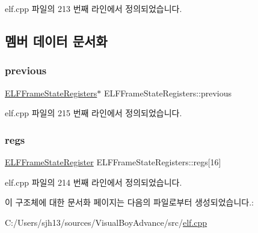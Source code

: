 elf.\+cpp 파일의 213 번째 라인에서 정의되었습니다.



\subsection{멤버 데이터 문서화}
\mbox{\label{struct_e_l_f_frame_state_registers_ac15ca53b64834c92c4c43b2652a082ed}} 
\subsubsection{\texorpdfstring{previous}{previous}}
{\footnotesize\ttfamily \mbox{\hyperlink{struct_e_l_f_frame_state_registers}{E\+L\+F\+Frame\+State\+Registers}}$\ast$ E\+L\+F\+Frame\+State\+Registers\+::previous}



elf.\+cpp 파일의 215 번째 라인에서 정의되었습니다.

\mbox{\label{struct_e_l_f_frame_state_registers_a0b3a4a2b86db2d98e9f0e05837bc7038}} 
\subsubsection{\texorpdfstring{regs}{regs}}
{\footnotesize\ttfamily \mbox{\hyperlink{struct_e_l_f_frame_state_register}{E\+L\+F\+Frame\+State\+Register}} E\+L\+F\+Frame\+State\+Registers\+::regs\mbox{[}16\mbox{]}}



elf.\+cpp 파일의 214 번째 라인에서 정의되었습니다.



이 구조체에 대한 문서화 페이지는 다음의 파일로부터 생성되었습니다.\+:\begin{DoxyCompactItemize}
\item 
C\+:/\+Users/sjh13/sources/\+Visual\+Boy\+Advance/src/\mbox{\hyperlink{elf_8cpp}{elf.\+cpp}}\end{DoxyCompactItemize}
